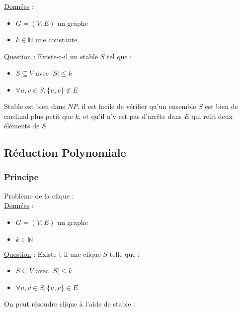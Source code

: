 \documentclass{article}
\begin{document}
      \underline{Données} :
      \begin{itemize}
        \item $G = (V, E)$ un graphe
        \item $k \in \mathbb N$ une constante.
      \end{itemize}
      \underline{Question} : Existe-t-il un stable $S$ tel que :
      \begin{itemize}
        \item $S \subseteq V$ avec $|S| \leq k$
        \item $\forall u, v \in S, \{u, v\} \not \in E$
      \end{itemize}

      Stable est bien dans $NP$, il est facile de vérifier qu'un ensemble $S$
      est bien de cardinal plus petit que $k$, et qu'il n'y est pas d'arrête
      dans $E$ qui relit deux éléments de $S$.

    \subsection{Réduction Polynomiale}

      \subsubsection{Principe}

      Problème de la clique : \\
      \underline{Données} :
      \begin{itemize}
        \item $G = (V, E)$ un graphe
        \item $k \in \mathbb N$
      \end{itemize}
      \underline{Question} : Existe-t-il une clique $S$ telle que :
      \begin{itemize}
        \item $S \subseteq V$ avec $|S| \leq k$
        \item $\forall u, v \in S, \{u, v\} \in E$
      \end{itemize}

      On peut résoudre clique à l'aide de stable :
\end{document}
